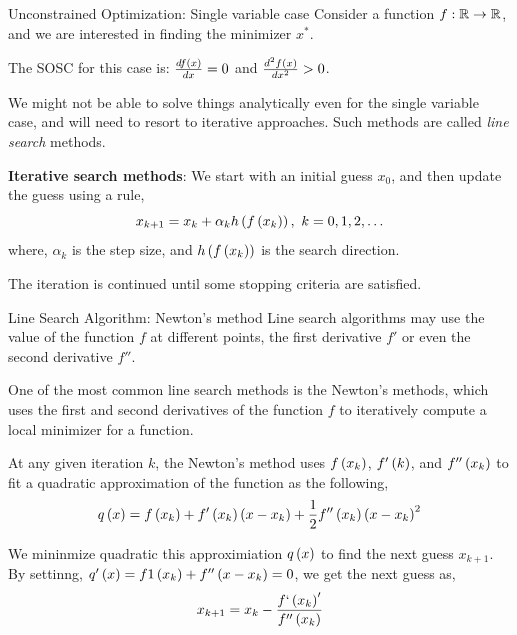 \documentclass[aspectratio=169]{beamer}
\def\mb{\ensuremath\mathbb}
\def\lp{\ensuremath\left(}
\def\rp{\ensuremath\right)}
\def\R{\ensuremath\mb{R}}
\newcommand{\ct}[1]{\lp #1\rp}
\begin{document}
\begin{frame}{Unconstrained Optimization: Single variable case}
  Consider a function $f: \R \to \R$, and we are interested in finding the minimizer $x^*$.
  \vspace{0.25cm}

  The SOSC for this case is: $\frac{df\ct{x}}{dx} = 0$ and $\frac{d^2f\ct{x}}{dx^2} > 0$.
  \vspace{0.25cm}

  We might not be able to solve things analytically even for the single variable case, and will need to resort to iterative approaches. Such methods are called \textit{line search} methods.
  \vspace{0.25cm}

  \textbf{Iterative search methods}: We start with an initial guess $x_0$, and then update the guess using a rule,
  \[ x_{k+1} = x_k + \alpha_k h\ct{f\ct{x_k}}, \,\, k = 0, 1, 2, \ldots \]
  where, $\alpha_k$ is the step size, and $h\ct{f\ct{x_k}}$ is the search direction.
  \vspace{0.25cm}

  The iteration is continued until some stopping criteria are satisfied.
\end{frame}


\begin{frame}{Line Search Algorithm: Newton's method}
  Line search algorithms may use the value of the function $f$ at different points, the first derivative $f'$ or even the second derivative $f''$.
  \vspace{0.25cm}

  One of the most common line search methods is the Newton's methods, which uses the first and second derivatives of the function $f$ to iteratively compute a local minimizer for a function.

  At any given iteration $k$, the Newton's method uses $f\ct{x_k}$, $f'\ct{k}$, and $f''\ct{x_k}$ to fit a quadratic approximation of the function as the following,
  \[ q\ct{x} = f\ct{x_k} + f'\ct{x_k}\ct{x - x_k} + \frac{1}{2}f''\ct{x_k}\ct{x - x_k}^2 \]

  We  mininmize quadratic this approximiation $q\ct{x}$ to find the next guess $x_{k+1}$. By settinng, $q'\ct{x} = f1\ct{x_k} + f''\ct{x - x_k} = 0$, we get the next guess as,
  \[ x_{k+1} = x_k - \frac{f`\ct{x_k}'}{f''\ct{x_k}} \] 
\end{frame}
\end{document}
